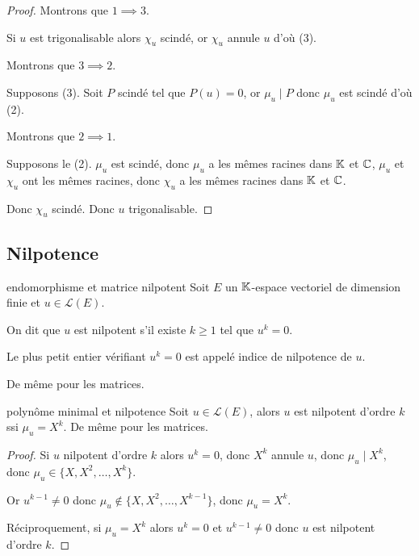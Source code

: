 \begin{proof}
    Montrons que $1 \implies 3$.
    
    Si $u$ est trigonalisable alors $\chi_u$ scindé, or $\chi_u$ annule $u$ d'où (3).

    \lvspace Montrons que $3 \implies 2$.
    
    Supposons (3). Soit $P$ scindé tel que $P(u) = 0$, or $\mu_u \mid P$ donc $\mu_u$ est scindé d'où (2).

    \lvspace Montrons que $2 \implies 1$.
    
    Supposons le (2). $\mu_u$ est scindé, donc $\mu_u$ a les mêmes racines dans $\mathbb{K}$ et $\mathbb{C}$, 
    $\mu_u$ et $\chi_u$ ont les mêmes racines, donc $\chi_u$ a les mêmes racines dans $\mathbb{K}$ et $\mathbb{C}$.

    Donc $\chi_u$ scindé. Donc $u$ trigonalisable. 
\end{proof}

\subsection{Nilpotence}

\begin{definition}{endomorphisme et matrice nilpotent}{}
    Soit $E$ un $\mathbb{K}$-espace vectoriel de dimension finie et $u \in \mathscr L(E)$. 

    On dit que $u$ est nilpotent s'il existe $k \geqslant 1$ tel que $u^k = 0$.

    Le plus petit entier vérifiant $u^k = 0$ est appelé indice de nilpotence de $u$.
    
    De même pour les matrices. 
\end{definition}


\begin{proposition}{polynôme minimal et nilpotence}{}
    Soit $u \in \mathscr L(E)$, alors $u$ est nilpotent d'ordre $k$ ssi $\mu_u = X^k$.
    De même pour les matrices.
\end{proposition}

\begin{proof}
    Si $u$ nilpotent d'ordre $k$ alors $u^k = 0$, donc $X^k$ annule $u$, 
    donc $\mu_u \mid X^k$, donc $\mu_u \in \{X, X^2, \ldots, X^k\}$.

    Or $u^{k - 1} \neq 0$ donc $\mu_u \notin \{X, X^2, \ldots, X^{k - 1}\}$, donc $\mu_u = X^k$.

    Réciproquement, si $\mu_u = X^k$ alors $u^k = 0$ et $u^{k - 1} \neq 0$ donc $u$ est nilpotent d'ordre $k$.
\end{proof}

